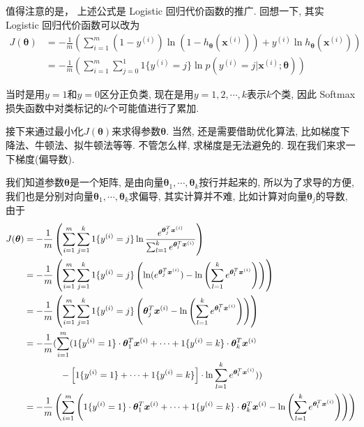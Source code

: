 \documentclass[a4paper,UTF8]{ctexart}
\theoremstyle{plain} \newtheorem{theorem}{定理}[section]
\theoremstyle{plain} \newtheorem{definition}{定义}[section]
\theoremstyle{plain} \newtheorem{lemma}{引理}[section]
\theoremstyle{plain} \newtheorem{proposition}{命题}[section]
\theoremstyle{plain} \newtheorem{example}{例}[section]
\theoremstyle{plain} \newtheorem{remark}{注}[section]
\theoremstyle{plain} \newtheorem{corollary}{推论}[section]
\begin{document}
值得注意的是， 上述公式是 Logistic 回归代价函数的推广. 回想一下, 其实 Logistic 回归代价函数可以改为
\begin{align*}
J(\bm{\theta}) & = - \frac{1}{m} \left( \sum_{i=1}^{m} (1 - y^{(i)}) \ln (1 - h_{\bm{\theta}}(\bm{x}^{(i)})) + y^{(i)} \ln h_{\bm{\theta}}(\bm{x}^{(i)}) \right) \\ 
& = - \frac{1}{m} \left( \sum_{i=1}^{m} \sum_{j=0}^{1} 1\{y^{(i)}=j\} \ln p(y^{(i)} = j | \bm{x}^{(i)}; \bm{\theta}) \right)
\end{align*}

当时是用$y=1$和$y=0$区分正负类, 现在是用$y=1,2,\cdots,k$表示$k$个类, 因此 Softmax 损失函数中对类标记的$k$个可能值进行了累加.

接下来通过最小化$J(\bm{\theta})$来求得参数$\bm{\theta}$. 当然, 还是需要借助优化算法, 比如梯度下降法、牛顿法、拟牛顿法等等. 不管怎么样, 求梯度是无法避免的. 现在我们来求一下梯度(偏导数).

我们知道参数$\bm{\theta}$是一个矩阵, 是由向量$\bm{\theta}_1, \cdots, \bm{\theta}_k$按行并起来的, 所以为了求导的方便, 我们也是分别对向量$\bm{\theta}_1, \cdots, \bm{\theta}_k$求偏导, 其实计算并不难, 比如计算对向量$\bm{\theta}_{j}$的导数, 由于
\begin{align*}
J(\bm{\theta}) & = - \frac{1}{m} \left( \sum_{i=1}^{m} \sum_{j=1}^{k} 1\{y^{(i)}=j\} \ln \frac{e^{\bm{\theta}_{j}^T \bm{x}^{(i)}}}{\sum_{l=1}^{k} e^{\bm{\theta}_{l}^T \bm{x}^{(i)}}} \right) \\ 
& = - \frac{1}{m} \left( \sum_{i=1}^{m} \sum_{j=1}^{k} 1\{y^{(i)}=j\} \left( \ln (e^{\bm{\theta}_{j}^T \bm{x}^{(i)}}) - \ln \left( \sum_{l=1}^{k} e^{\bm{\theta}_{l}^T \bm{x}^{(i)}} \right) \right) \right) \\ 
& = - \frac{1}{m} \left( \sum_{i=1}^{m} \sum_{j=1}^{k} 1\{y^{(i)}=j\} \left( \bm{\theta}_{j}^T \bm{x}^{(i)} - \ln \left( \sum_{l=1}^{k} e^{\bm{\theta}_{l}^T \bm{x}^{(i)}} \right) \right) \right) \\
& = - \frac{1}{m} \large( \sum_{i=1}^{m} ( 1\{y^{(i)}=1\} \cdot \bm{\theta}_{1}^T \bm{x}^{(i)} + \cdots +  1\{y^{(i)}=k\} \cdot \bm{\theta}_{k}^T \bm{x}^{(i)}  \\ 
& \qquad \qquad - \left[ 1\{y^{(i)}=1\} + \cdots + 1\{y^{(i)}=k\} \right] \cdot \ln \sum_{l=1}^{k} e^{\bm{\theta}_{l}^T \bm{x}^{(i)}} ) \large) \\ 
& = - \frac{1}{m} \left( \sum_{i=1}^{m} \left( 1\{y^{(i)}=1\} \cdot \bm{\theta}_{1}^T \bm{x}^{(i)} + \cdots + 1\{y^{(i)}=k\} \cdot \bm{\theta}_{k}^T \bm{x}^{(i)}  - \ln \left( \sum_{l=1}^{k} e^{\bm{\theta}_{l}^T \bm{x}^{(i)}} \right) \right) \right)
\end{align*}
\end{document}
